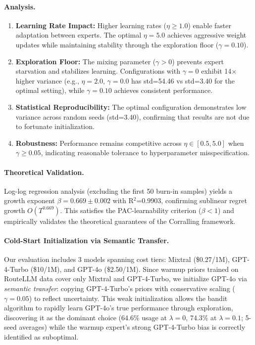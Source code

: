 \paragraph{Analysis.}
\begin{enumerate}[nosep]
    \item \textbf{Learning Rate Impact:} Higher learning rates ($\eta \geq 1.0$) enable faster adaptation between experts. The optimal $\eta=5.0$ achieves aggressive weight updates while maintaining stability through the exploration floor ($\gamma=0.10$).
    
    \item \textbf{Exploration Floor:} The mixing parameter ($\gamma > 0$) prevents expert starvation and stabilizes learning. Configurations with $\gamma=0$ exhibit 14$\times$ higher variance (e.g., $\eta=2.0$, $\gamma=0.0$ has std=54.46 vs std=3.40 for the optimal setting), while $\gamma=0.10$ achieves consistent performance.
    
    \item \textbf{Statistical Reproducibility:} The optimal configuration demonstrates low variance across random seeds (std=3.40), confirming that results are not due to fortunate initialization.
    
    \item \textbf{Robustness:} Performance remains competitive across $\eta \in [0.5, 5.0]$ when $\gamma \geq 0.05$, indicating reasonable tolerance to hyperparameter misspecification.
\end{enumerate}

\paragraph{Theoretical Validation.}
Log-log regression analysis (excluding the first 50 burn-in samples) yields a growth exponent $\beta=0.669 \pm 0.002$ with R$^2$=0.9903, confirming sublinear regret growth $O(T^{0.669})$.
This satisfies the PAC-learnability criterion ($\beta < 1$) and empirically validates the theoretical guarantees of the Corralling framework.

\paragraph{Cold-Start Initialization via Semantic Transfer.}
Our evaluation includes 3 models spanning cost tiers: Mixtral (\$0.27/1M), GPT-4-Turbo (\$10/1M), and GPT-4o (\$2.50/1M).
Since warmup priors trained on RouteLLM data cover only Mixtral and GPT-4-Turbo, we initialize GPT-4o via \emph{semantic transfer}: copying GPT-4-Turbo's priors with conservative scaling ($\gamma=0.05$) to reflect uncertainty.
This weak initialization allows the bandit algorithm to rapidly learn GPT-4o's true performance through exploration, discovering it as the dominant choice (64.6\% usage at $\lambda=0$, 74.3\% at $\lambda=0.1$; 5-seed averages) while the warmup expert's strong GPT-4-Turbo bias is correctly identified as suboptimal.
